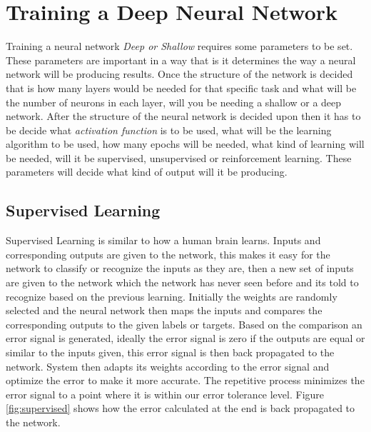\documentclass[12pt, a4paper]{report}
\begin{document}
\section{Training a Deep Neural Network}\label{train}

Training a neural network \textit{Deep or Shallow} requires some parameters to be set. These parameters are important in a way that is it determines the way a neural network will be producing results. Once the structure of the network is decided that is how many layers would be needed for that specific task and what will be the number of neurons in each layer, will you be needing a shallow or a deep network. After the structure of the neural network is decided upon then it has to be decide what \textit{activation function} is to be used, what will be the learning algorithm to be used, how many epochs will be needed, what kind of learning will be needed, will it be supervised, unsupervised or reinforcement learning. These parameters will decide what kind of output will it be producing.\\ \par

\subsection{Supervised Learning}\label{sec:supervisedLearning}

Supervised Learning is similar to how a human brain learns. Inputs and corresponding outputs are given to the network, this makes it easy for the network to classify or recognize the inputs as they are, then a new set of inputs are given to the network which the network has never seen before and its told to recognize based on the previous learning. Initially the weights are randomly selected and the neural network then maps the inputs and compares the corresponding outputs to the given labels or targets. Based on the comparison an error signal is generated, ideally the error signal is zero if the outputs are equal or similar to the inputs given, this error signal is then back propagated to the network. System then adapts its weights according to the error signal and optimize the error to make it more accurate. The repetitive process minimizes the error signal to a point where it is within our error tolerance level. Figure \ref{fig:supervised} shows how the error calculated at the end is back propagated to the network.\\ \par
\end{document}
